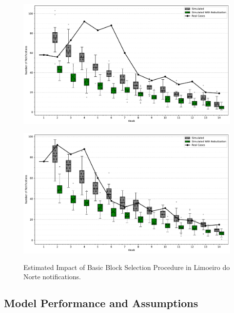 \begin{figure}[h!]
    \begin{minipage}[c]{.45\textwidth}
      \centering
      \includegraphics[scale=0.25]{images/action-experiments/lm_2020-07-05_weekly_nebulized.pdf} \\
    \end{minipage}
    \hfill
    \begin{minipage}[c]{.45\textwidth}
        \centering
        \includegraphics[scale=0.25]{images/action-experiments/lm_2020-07-19_weekly_nebulized.pdf} \\
    \end{minipage}
    \caption{\label{fig:emergency-action-impact-lm} Estimated Impact of Basic Block Selection Procedure in Limoeiro do Norte notifications.}
\end{figure}

\subsection{Model Performance and Assumptions}

